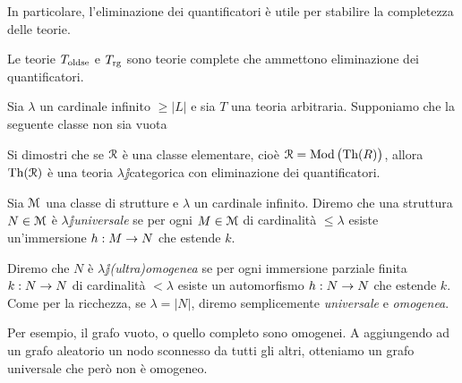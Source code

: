 In particolare, l'eliminazione dei quantificatori \`e utile per stabilire la completezza delle teorie.

\begin{corollary}\label{elimquanToldseTrg}
Le teorie  $T_{\rm oldse}$  e $T_{\rm rg}$ sono teorie complete che ammettono eliminazione dei quantificatori.\QED
\end{corollary}


\begin{exercise}\label{ex_R=Mod(Th(R))}
Sia $\lambda$ un cardinale infinito $\ge|L|$ e sia $T$ una teoria arbitraria. Supponiamo che la seguente classe non sia vuota 


Si dimostri che se $\EuScript R$ \`e una classe elementare, cio\`e $\EuScript R=\mathop\textrm{Mod}\big(\textrm{Th}(R)\big)$, allora $\textrm{Th}(\EuScript R)$ \`e una teoria $\lambda\jj$categorica con eliminazione dei quantificatori.\QED 
\end{exercise}

\begin{definition}\label{def_omogenea_universale}
Sia $\EuScript M$ una classe di strutture e $\lambda$ un cardinale infinito. Diremo che una struttura $N\in\EuScript M$ \`e \emph{$\lambda\jj$universale\/} se per ogni $M\in\EuScript M$ di cardinalit\`a $\le\lambda$ esiste un'immersione $h:M\rightarrow N$ che estende $k$. 

Diremo che $N$ \`e \emph{$\lambda\jj$(ultra)omogenea\/} se per ogni immersione parziale finita $k:N\rightarrow N$ di cardinalit\`a $<\lambda$ esiste un automorfismo $h:N\rightarrow N$ che estende $k$. Come per la ricchezza, se $\lambda=|N|$, diremo semplicemente \emph{universale\/} e \emph{omogenea}.
\end{definition}

Per esempio, il grafo vuoto, o quello completo sono omogenei. A aggiungendo ad un grafo aleatorio un nodo sconnesso da tutti gli altri, otteniamo un grafo universale che per\`o non \`e omogeneo.


